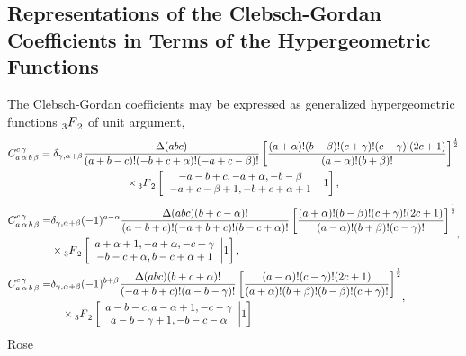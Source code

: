\subsection{Representations of the Clebsch-Gordan Coefficients in Terms of the Hypergeometric Functions}\label{sec:8.2.5}
The Clebsch-Gordan coefficients may be expressed as generalized hypergeometric functions $\prescript{}{3}{F}_{2}^{}$ of unit argument,
\begin{gather}
C_{a\,\alpha\,b\,\beta}^{c\,\gamma}=\delta_{\gamma, \alpha+\beta} \frac{\Delta(a b c)}{(a+b-c)!(-b+c+\alpha)!(-a+c-\beta)!}\left[\frac{(a+\alpha)!(b-\beta)!(c+\gamma)!(c-\gamma)!(2 c+1)}{(a-\alpha)!(b+\beta)!}\right]^{\frac{1}{2}}  \notag\\
\times\prescript{}{3}{F}_{2}^{}\left[\left.\begin{array}{c}
-a-b+c,-a+\alpha,-b-\beta \\
-a+c-\beta+1,-b+c+\alpha+1
\end{array} \right\rvert\, 1\right], \label{eq:8:2:21}
\end{gather}
\begin{align}
& \begin{aligned}
\clebsch{a}{\alpha}{b}{\beta}{c}{\gamma}= & \delta_{\gamma, \alpha+\beta}(-1)^{a-\alpha} \frac{\Delta(a b c)(b+c-\alpha)!}{(a-b+c)!(-a+b+c)!(b-c+\alpha)!}\left[\frac{(a+\alpha)!(b-\beta)!(c+\gamma)!(2 c+1)}{(a-\alpha)!(b+\beta)!(c-\gamma)!}\right]^{\frac{1}{2}} \\
& \times\Fnm[r]{3}{2}{a+\alpha+1,-a+\alpha,-c+\gamma}{-b-c+\alpha, b-c+\alpha+1}{1},
\end{aligned}, \\
& \begin{aligned}
\clebsch{a}{\alpha}{b}{\beta}{c}{\gamma}= & \delta_{\gamma, \alpha+\beta}(-1)^{b+\beta} \frac{\Delta(a b c)(b+c+\alpha)!}{(-a+b+c)!(a-b-\gamma)!}\left[\frac{(a-\alpha)!(c-\gamma)!(2 c+1)}{(a+\alpha)!(b+\beta)!(b-\beta)!(c+\gamma)!}\right]^{\frac{1}{2}} \\
& \quad \times\Fnm[r]{3}{2}{a-b-c, a-\alpha+1,-c-\gamma}{
a-b-\gamma+1,-b-c-\alpha}{1}
\end{aligned}, \label{eq:8:2:23}
\end{align}
Rose \cite{ref030}
